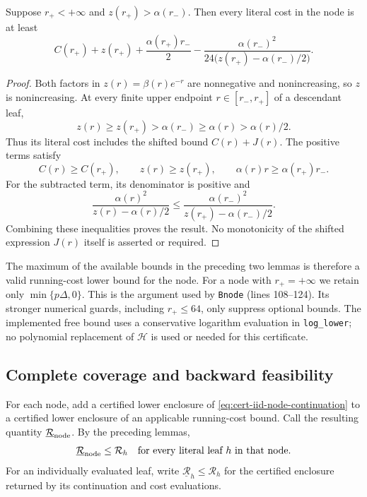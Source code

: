 \begin{lemma}
\label{lem:cert-iid-shifted}
Suppose $r_+<+\infty$ and $z(r_+)>\alpha(r_-)$.  Then every literal
cost in the node is at least
\begin{equation}
 C(r_+)+z(r_+)+\frac{\alpha(r_+)r_-}{2}
 -\frac{\alpha(r_-)^2}
 {24\bigl(z(r_+)-\alpha(r_-)/2\bigr)}.
 \label{eq:cert-iid-node-shifted}
\end{equation}
\end{lemma}
\begin{proof}
Both factors in $z(r)=\beta(r)e^{-r}$ are nonnegative and
nonincreasing, so $z$ is nonincreasing.  At every finite upper endpoint
$r\in[r_-,r_+]$ of a descendant leaf,
\[
 z(r)\ge z(r_+)>\alpha(r_-)\ge\alpha(r)>\alpha(r)/2.
\]
Thus its literal cost includes the shifted bound $C(r)+J(r)$.
The positive terms satisfy
\[
 C(r)\ge C(r_+),\qquad z(r)\ge z(r_+),\qquad
 \alpha(r)r\ge\alpha(r_+)r_-.
\]
For the subtracted term, its denominator is positive and
\[
 \frac{\alpha(r)^2}{z(r)-\alpha(r)/2}
 \le
 \frac{\alpha(r_-)^2}{z(r_+)-\alpha(r_-)/2}.
\]
Combining these inequalities proves the result.  No monotonicity of the
shifted expression $J(r)$ itself is asserted or required.
\end{proof}

The maximum of the available bounds in the preceding two lemmas is
therefore a valid running-cost lower bound for the node.  For a node
with $r_+=+\infty$ we retain only $\min\{p\Delta,0\}$.  This is the
argument used by \texttt{Bnode} (lines 108--124).  Its stronger numerical
guards, including $r_+\le64$, only suppress optional bounds.  The
implemented free bound uses a conservative logarithm evaluation in
\texttt{log\_lower}; no polynomial replacement of $\mathcal H$ is used or
needed for this certificate.

\subsection{Complete coverage and backward feasibility}
\label{sec:cert-iid-backward}

For each node, add a certified lower enclosure of
\eqref{eq:cert-iid-node-continuation} to a certified lower enclosure of
an applicable running-cost bound.  Call the resulting quantity
$\underline{\mathcal R}_{\rm node}$.  By the preceding lemmas,
\begin{equation}
 \underline{\mathcal R}_{\rm node}\le\mathcal R_h
 \quad\text{for every literal leaf }h\text{ in that node}.
 \label{eq:cert-iid-node-enclosure}
\end{equation}
For an individually evaluated leaf, write
$\underline{\mathcal R}_h\le\mathcal R_h$ for the certified enclosure
returned by its continuation and cost evaluations.

